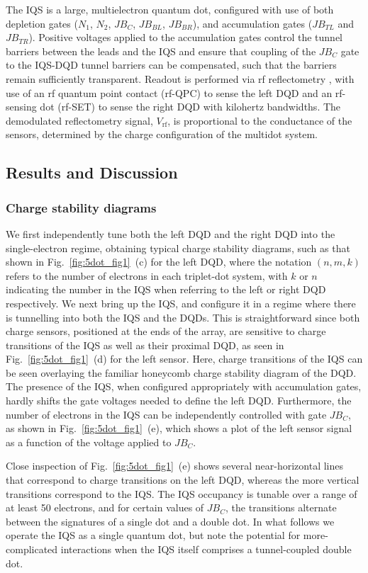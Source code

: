 The IQS is a large, multielectron quantum dot, configured with use of both depletion gates ($N_{1}$, $N_{2}$, $JB_{C}$, $JB_{BL}$, $JB_{BR}$), and accumulation gates ($JB_{TL}$ and $JB_{TR}$).  Positive voltages applied to the accumulation gates control the tunnel barriers between the leads and the IQS and ensure that coupling of the $JB_{C}$ gate to the IQS-DQD tunnel barriers can be compensated, such that the barriers remain sufficiently transparent. Readout is performed via rf reflectometry \cite{Reilly:2007ig}, with use of an rf quantum point contact (rf-QPC) to sense the left DQD and an rf-sensing dot (rf-SET) to sense the right DQD with kilohertz bandwidths. The demodulated reflectometry signal, $V_{\textrm{rf}}$, is proportional to the conductance of the sensors, determined by the charge configuration of the multidot system.

\subsection{Results and Discussion}
\subsubsection{Charge stability diagrams}
We first independently tune both the left DQD and the right DQD into the single-electron regime, obtaining typical charge stability diagrams, such as that shown in Fig.~\ref{fig:5dot_fig1}~(c) for the left DQD, where the notation $\left(n,m,k\right)$ refers to the number of electrons in each triplet-dot system, with $k$ or $n$ indicating the number in the IQS when referring to the left or right DQD respectively. We next bring up the IQS, and configure it in a regime where there is tunnelling into both the IQS and the DQDs. This is straightforward since both charge sensors, positioned at the ends of the array, are sensitive to charge transitions of the IQS as well as their proximal DQD, as seen in Fig.~\ref{fig:5dot_fig1}~(d) for the left sensor. Here, charge transitions of the IQS can be seen overlaying the familiar honeycomb charge stability diagram of the DQD. The presence of the IQS, when configured appropriately with accumulation gates,  hardly shifts the gate voltages needed to define the left DQD. Furthermore, the number of electrons in the IQS can be independently controlled with gate $JB_{C}$, as shown in Fig.~\ref{fig:5dot_fig1}~(e), which shows a plot of the left sensor signal as a function of the voltage applied to $JB_{C}$.

Close inspection of Fig.~\ref{fig:5dot_fig1}~(e) shows several near-horizontal lines that correspond to charge transitions on the left DQD,  whereas the more vertical transitions correspond to the IQS. The IQS occupancy is tunable over a range of at least 50 electrons, and for certain values of $JB_{C}$, the transitions alternate between the signatures of a single dot and a double dot. In what follows we operate the IQS as a single quantum dot, but note the potential for more-complicated interactions when the IQS itself comprises a tunnel-coupled double dot.

